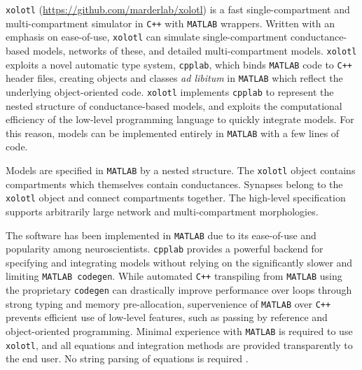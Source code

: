 \documentclass{frontiersSCNS} %
\begin{document}
\texttt{xolotl} (\url{https://github.com/marderlab/xolotl}) is a fast single-compartment and multi-compartment simulator in \texttt{C++} with \texttt{MATLAB} wrappers. Written with an emphasis on ease-of-use, \texttt{xolotl} can simulate single-compartment conductance-based models, networks of these, and detailed multi-compartment models. \texttt{xolotl} exploits a novel automatic type system, \texttt{cpplab}, which binds \texttt{MATLAB} code to \texttt{C++} header files, creating objects and classes \textit{ad libitum} in \texttt{MATLAB} which reflect the underlying object-oriented code. \texttt{xolotl} implements \texttt{cpplab} to represent the nested structure of conductance-based models, and exploits the computational efficiency of the low-level programming language to quickly integrate models. For this reason, models can be implemented entirely in \texttt{MATLAB} with a few lines of code.

Models are specified in \texttt{MATLAB} by a nested structure. The \texttt{xolotl} object contains compartments which themselves contain conductances. Synapses belong to the \texttt{xolotl} object and connect compartments together. The high-level specification supports arbitrarily large network and multi-compartment morphologies. 


The software has been implemented in \texttt{MATLAB} due to its ease-of-use and popularity among neuroscientists. \texttt{cpplab} provides a powerful backend for specifying and integrating models without relying on the significantly slower and limiting \texttt{MATLAB codegen}. While automated \texttt{C++} transpiling from \texttt{MATLAB} using the proprietary \texttt{codegen} can drastically improve performance over loops through strong typing and memory pre-allocation, supervenience of \texttt{MATLAB} over \texttt{C++} prevents efficient use of low-level features, such as passing by reference and object-oriented programming.   Minimal experience with \texttt{MATLAB} is required to use \texttt{xolotl}, and all equations and integration methods are provided transparently to the end user. No string parsing of equations is required \autocite{sherfeyDynaSimMATLABToolbox2018, stimbergBrianSecondComing2013, stimbergEquationorientedSpecificationNeural2014}. 
\end{document}
